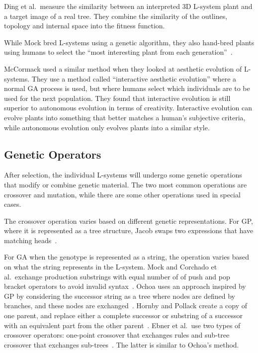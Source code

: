 Ding et al.\ measure the similarity between an interpreted 3D \gls{L-system} plant and a target image of a real tree.
They combine the similarity of the outlines, topology and internal space into the fitness function.~\cite{2013Ding}

While Mock bred \glspl{L-system} using a genetic algorithm, they also hand-bred plants using humans to select the ``most interesting plant from each generation''~\cite{1998Mock}.

McCormack used a similar method when they looked at aesthetic evolution of \glspl{L-system}.
They use a method called ``interactive aesthetic evolution'' where a normal \gls{GA} process is used, but where humans select which individuals are to be used for the next population.
They found that interactive evolution is still superior to autonomous evolution in terms of creativity.
Interactive evolution can evolve plants into something that better matches a human's subjective criteria, while autonomous evolution only evolves plants into a similar style.~\cite{2004McCormack}

\subsection{Genetic Operators}
After selection, the individual \glspl{L-system} will undergo some genetic operations that modify or combine genetic material.
The two most common operations are crossover and mutation, while there are some other operations used in special cases.

The crossover operation varies based on different genetic representations.
For \gls{GP}, where it is represented as a tree structure, Jacob swaps two expressions that have matching heads~\cite{1994Jacob,1995Jacob}.

For \gls{GA} when the genotype is represented as a string, the operation varies based on what the string represents in the \gls{L-system}.
Mock and Corchado et al.\ exchange production substrings with equal number of of push and pop bracket operators to avoid invalid syntax~\cite{1998Mock,2009Corchado}.
Ochoa uses an approach inspired by \gls{GP} by considering the successor string as a tree where nodes are defined by branches, and these nodes are exchanged~\cite{1998Ochoa}.
Hornby and Pollack create a copy of one parent, and replace either a complete successor or substring of a successor with an equivalent part from the other parent~\cite{2001Hornby}.
Ebner et al.\ use two types of crossover operators: one-point crossover that exchanges rules and sub-tree crossover that exchanges sub-trees~\cite{2002Ebner,2003Ebner}.
The latter is similar to Ochoa's method.

